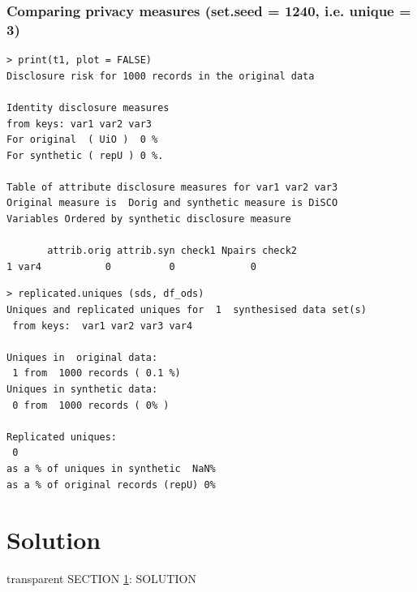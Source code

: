 \documentclass[t,8pt,utfx8]{beamer}
\begin{document}
\begin{spacing}{1.25}
\begin{frame}[fragile]
\frametitle{Comparing privacy measures (set.seed = 1240, i.e. unique = 3)}
  


\begin{minipage}[t]{0.48\textwidth}
\begin{lstlisting}
> print(t1, plot = FALSE)
Disclosure risk for 1000 records in the original data

Identity disclosure measures
from keys: var1 var2 var3 
For original  ( UiO )  0 %
For synthetic ( repU ) 0 %.

Table of attribute disclosure measures for var1 var2 var3 
Original measure is  Dorig and synthetic measure is DiSCO 
Variables Ordered by synthetic disclosure measure

       attrib.orig attrib.syn check1 Npairs check2
1 var4           0          0             0       
\end{lstlisting}
\end{minipage}%
  \hfill%
\begin{minipage}[t]{0.48\textwidth}
\begin{lstlisting}
> replicated.uniques (sds, df_ods)
Uniques and replicated uniques for  1  synthesised data set(s)
 from keys:  var1 var2 var3 var4 

Uniques in  original data:
 1 from  1000 records ( 0.1 %) 
Uniques in synthetic data:
 0 from  1000 records ( 0% )

Replicated uniques:
 0
as a % of uniques in synthetic  NaN%
as a % of original records (repU) 0%
\end{lstlisting}
\end{minipage}
\end{frame}


\section{Solution}\label{sec:solution}
\begin{frame}[c,plain]
\vskip-4mm
\begin{beamercolorbox}[wd=\boxwidth,ht=22.11mm]{transparent}%
    \vfill%
    \leftinsert%
    \MakeUppercase{Section \ref{sec:solution}: Solution
} %
\end{beamercolorbox}
\vskip-3mm
\end{frame}


\end{spacing}
\end{document}
